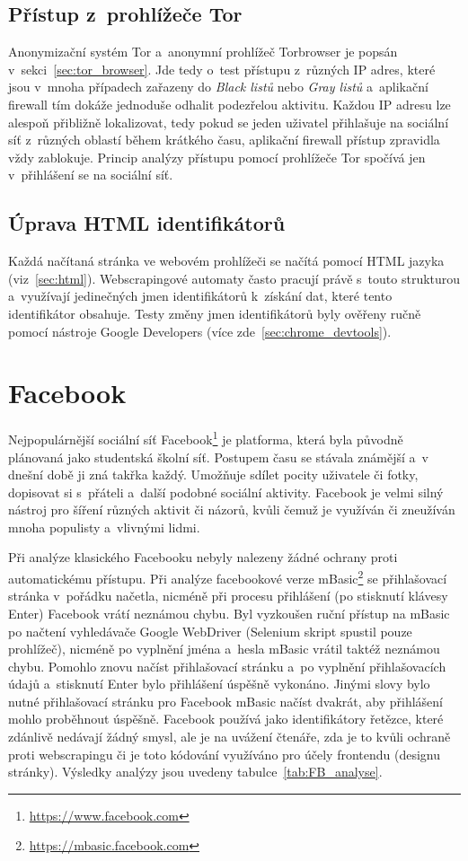 \subsection*{Přístup z~prohlížeče Tor}
Anonymizační systém Tor a~anonymní prohlížeč Torbrowser je popsán v~sekci~\ref{sec:tor_browser}. Jde tedy o~test přístupu z~různých IP adres, které jsou v~mnoha případech zařazeny do \textit{Black listů} nebo \textit{Gray listů} a~aplikační firewall tím dokáže jednoduše odhalit podezřelou aktivitu. Každou IP adresu lze alespoň přibližně lokalizovat, tedy pokud se jeden uživatel přihlašuje na sociální síť z~různých oblastí během krátkého času, aplikační firewall přístup zpravidla vždy zablokuje. Princip analýzy přístupu pomocí prohlížeče Tor spočívá jen v~přihlášení se na sociální síť.

\subsection*{Úprava HTML identifikátorů}
Každá načítaná stránka ve webovém prohlížeči se načítá pomocí HTML jazyka (viz~\ref{sec:html}). Webscrapingové automaty často pracují právě s~touto strukturou a~využívají jedinečných jmen identifikátorů k~získání dat, které tento identifikátor obsahuje. Testy změny jmen identifikátorů byly ověřeny ručně pomocí nástroje Google Developers (více zde~\ref{sec:chrome_devtools}).

\section{Facebook}
Nejpopulárnější sociální síť Facebook\footnote{\href{https://www.facebook.com}{https://www.facebook.com}} je platforma, která byla původně plánovaná jako studentská školní síť. Postupem času se stávala známější a~v dnešní době ji zná takřka každý. Umožňuje sdílet pocity uživatele či fotky, dopisovat si s~přáteli a~další podobné sociální aktivity. Facebook je velmi silný nástroj pro šíření různých aktivit či názorů, kvůli čemuž je využíván či zneužíván mnoha populisty a~vlivnými lidmi.

Při analýze klasického Facebooku nebyly nalezeny žádné ochrany proti automatickému přístupu. Při analýze facebookové verze mBasic\footnote{\href{https://mbasic.facebook.com}{https://mbasic.facebook.com}} se přihlašovací stránka v~pořádku načetla, nicméně při procesu přihlášení (po stisknutí klávesy Enter) Facebook vrátí neznámou chybu. Byl vyzkoušen ruční přístup na mBasic po načtení vyhledávače Google WebDriver (Selenium skript spustil pouze prohlížeč), nicméně po vyplnění jména a~hesla mBasic vrátil taktéž neznámou chybu. Pomohlo znovu načíst přihlašovací stránku a~po vyplnění přihlašovacích údajů a~stisknutí Enter bylo přihlášení úspěšně vykonáno. Jinými slovy bylo nutné přihlašovací stránku pro Facebook mBasic načíst dvakrát, aby přihlášení mohlo proběhnout úspěšně. Facebook používá jako identifikátory řetězce, které zdánlivě nedávají žádný smysl, ale je na uvážení čtenáře, zda je to kvůli ochraně proti webscrapingu či je toto kódování využíváno pro účely frontendu (designu stránky). Výsledky analýzy jsou uvedeny tabulce~\ref{tab:FB_analyse}.

